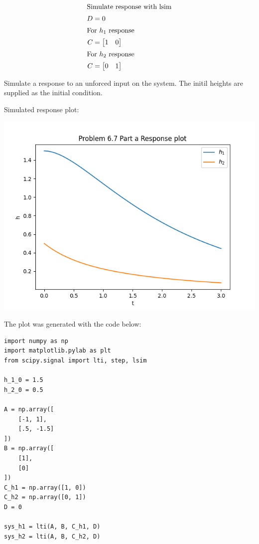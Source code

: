 \documentclass[12pt]{article}
\begin{document}
\begin{enumerate}
\begin{enumerate}
\begin{align*}
        \intertext{Simulate response with lsim}
        D &= 0 \\
        \intertext{For $h_1$ response}
        C &= \begin{bmatrix}
            1 & 0 \\
        \end{bmatrix} \\
        \intertext{For $h_2$ response}
        C &= \begin{bmatrix}
            0 & 1 \\
        \end{bmatrix}
    \end{align*}    

    Simulate a response to an unforced input on the system. The initil heights are supplied as the initial condition.

    Simulated response plot:

    \includegraphics{assets/p2_a.png}

    The plot was generated with the code below:

\begin{verbatim}
import numpy as np
import matplotlib.pylab as plt
from scipy.signal import lti, step, lsim

h_1_0 = 1.5
h_2_0 = 0.5

A = np.array([
    [-1, 1],
    [.5, -1.5]
])
B = np.array([
    [1],
    [0]
])
C_h1 = np.array([1, 0])
C_h2 = np.array([0, 1])
D = 0

sys_h1 = lti(A, B, C_h1, D)
sys_h2 = lti(A, B, C_h2, D)


\end{verbatim}
\end{enumerate}
\end{enumerate}
\end{document}
